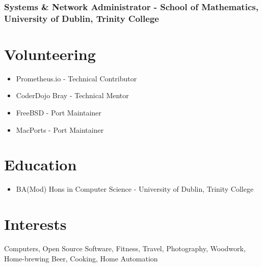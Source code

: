 \documentclass[a4paper, 10pt] {article}
\begin{document}
\subsubsection*{Systems \& Network Administrator - School of Mathematics, University of Dublin, Trinity College}

\section*{Volunteering}

\begin{itemize}[noitemsep]
  \item Prometheus.io - Technical Contributor
  \item CoderDojo Bray - Technical Mentor
  \item FreeBSD - Port Maintainer
  \item MacPorts - Port Maintainer
\end{itemize}

\section*{Education}

\begin{itemize}
  \item BA(Mod) Hons in Computer Science - University of Dublin, Trinity College
\end{itemize}

\section*{Interests}

Computers, Open Source Software, Fitness, Travel, Photography, Woodwork,
Home-brewing Beer, Cooking, Home Automation
\end{document}
